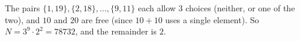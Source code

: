 The pairs $\{1,19\},\{2,18\},\dots,\{9,11\}$ each allow $3$ choices (neither, or one of the two), and $10$ and $20$ are free (since $10+10$ uses a single element). So $N=3^9\cdot2^2=78732$, and the remainder is $\boxed{2}$.
